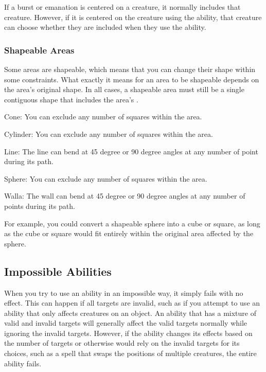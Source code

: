       If a burst or emanation is centered on a creature, it normally includes that creature.
      However, if it is centered on the creature using the ability, that creature can choose whether they are included when they use the ability.

    \subsubsection{Shapeable Areas}\label{Shapeable Areas}
      Some areas are shapeable, which means that you can change their shape within some constraints.
      What exactly it means for an area to be shapeable depends on the area's original shape.
      In all cases, a shapeable area must still be a single contiguous shape that includes the area's .
      \begin{raggeditemize}
        \item Cone: You can exclude any number of squares within the area.
        \item Cylinder: You can exclude any number of squares within the area.
        \item Line: The line can bend at 45 degree or 90 degree angles at any number of point during its path.
        \item Sphere: You can exclude any number of squares within the area.
        \item Walla: The wall can bend at 45 degree or 90 degree angles at any number of points during its path.
      \end{raggeditemize}

      For example, you could convert a shapeable sphere into a cube or square, as long as the cube or square would fit entirely within the original area affected by the sphere.

  \subsection{Impossible Abilities}
    When you try to use an ability in an impossible way, it simply fails with no effect.
    This can happen if all targets are invalid, such as if you attempt to use an ability that only affects creatures on an object.
    An ability that has a mixture of valid and invalid targets will generally affect the valid targets normally while ignoring the invalid targets.
    However, if the ability changes its effects based on the number of targets or otherwise would rely on the invalid targets for its choices, such as a spell that swaps the positions of multiple creatures, the entire ability fails.

